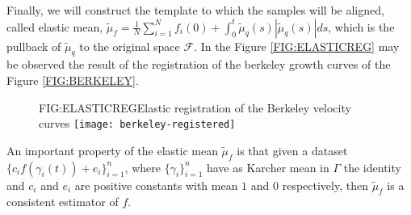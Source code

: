 Finally, we will construct the template to which the samples will be aligned,
called elastic mean,
$\tilde \mu_f = \frac{1}{N} \sum_{i=1}^N f_i(0) +
\int_0^t \tilde \mu_q(s) | \tilde \mu_q(s)| ds$,
which is the pullback of $\tilde \mu_q$ to the original space $\mathcal{F}$. In
the Figure \ref{FIG:ELASTICREG} may be observed the result of the registration of the
berkeley growth curves of the Figure \ref{FIG:BERKELEY}.

\begin{figure}[Elastic registration of the Berkeley velocity curves]{FIG:ELASTICREG}{Elastic registration of the Berkeley velocity curves}
  \texttt{[image: berkeley-registered]}
\end{figure}

An important property of the elastic mean
$\tilde \mu_f$ is that given a dataset $\{c_i f(\gamma_i(t)) + e_i\}_{i=1}^{n}$, where
$\{\gamma_i\}_{i=1}^{n}$ have as Karcher mean in $\Gamma$ the identity and $c_i$ and $e_i$ are positive
constants with mean $1$ and $0$ respectively, then $\tilde \mu_f$ is a
consistent estimator of $f$\cite{Srivastava2011}.
